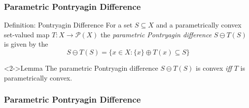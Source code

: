 \documentclass{beamer}
\theoremstyle{plain}
\begin{document}
\begin{frame}
\frametitle{Parametric Pontryagin Difference}
\begin{block}{Definition: Pontryagin Difference}
For a set $S\subseteq X$ and a parametrically convex set-valued map $T:X\rightarrow \mathcal P(X)$
the \emph{parametric Pontryagin difference} $S\ominus T(S)$ is given by the 
$$
S\ominus T(S) = \bigl\{x\in X : \{x\}\oplus T(x)\subseteq S \bigr\}
$$
\end{block}

\begin{block}<2->{Lemma}
The parametric Pontryagin difference $S\ominus T(S)$ is convex \emph{iff} $T$ is parametrically convex.
\end{block}
\end{frame}

\begin{frame}
\frametitle{Parametric Pontryagin Difference}


\end{frame}
\end{document}
